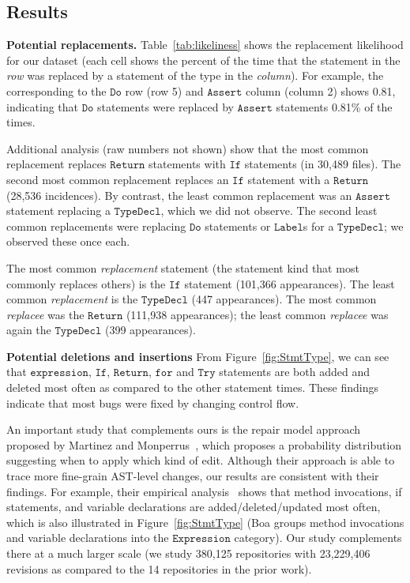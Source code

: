 \documentclass{sig-alternate-05-2015}
\begin{document}
\subsection{Results}

\noindent\textbf{Potential replacements.} Table~\ref{tab:likeliness} shows
the replacement likelihood for our dataset 
(each cell shows the percent of the time that the statement in the \emph{row}
was replaced by a statement of the type in the \emph{column}). For example, 
the corresponding to the $\mathtt{Do}$ row (row 5) and $\mathtt{Assert}$ column (column 2)
shows 0.81, indicating that $\mathtt{Do}$ statements were
replaced by $\mathtt{Assert}$ statements 0.81\% of the times.

Additional analysis (raw numbers not shown) show that the most common replacement
replaces $\mathtt{Return}$ statements with $\mathtt{If}$ statements (in 30,489 files). The
second most common replacement replaces an $\mathtt{If}$ statement with a $\mathtt{Return}$
(28,536 incidences). 
By contrast, the least common replacement was an $\mathtt{Assert}$
statement replacing a $\mathtt{TypeDecl}$, which we did not observe. 
The second least common replacements were replacing $\mathtt{Do}$ statements or $\mathtt{Label}$s for a $\mathtt{TypeDecl}$; we observed these once each.  

The most common
\emph{replacement} statement (the statement kind that most commonly replaces
others) is the $\mathtt{If}$ statement (101,366 appearances). The least
common \emph{replacement} is the $\mathtt{TypeDecl}$ (447
appearances).
The most common \emph{replacee} was the
$\mathtt{Return}$ (111,938 appearances); the least common
\emph{replacee} was again the $\mathtt{TypeDecl}$ (399 appearances).


\vspace{1ex}
\noindent \textbf{Potential deletions and insertions} From Figure~\ref{fig:StmtType}, we
can see that $\mathtt{expression}$, $\mathtt{If}$, $\mathtt{Return}$,
$\mathtt{for}$ and $\mathtt{Try}$ statements are both added and deleted
most often as compared to the other statement times. 
These findings indicate that most bugs were fixed by changing control
flow.

An important study that complements ours is the repair model approach
proposed by Martinez and Monperrus~\cite{Martinez:2015ez}, which proposes
a probability distribution suggesting when to apply which kind of edit. Although their
approach is able to trace more fine-grain AST-level changes, our results are
consistent with their findings. For example, their empirical
analysis~\cite{Martinez:2015ez} shows that method invocations, if statements,
and variable declarations are added/deleted/updated most often, which
is also illustrated in Figure~\ref{fig:StmtType} (Boa groups method invocations and
variable declarations into the $\mathtt{Expression}$ category).  Our study
complements there at a much larger scale (we study 380,125 repositories with 23,229,406
revisions as compared to the 14 repositories in the prior work). 
\end{document}

